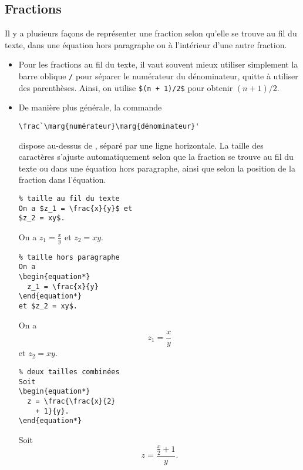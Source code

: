 \subsection{Fractions}
\label{sec:math:bases:fractions}

Il y a plusieurs façons de représenter une fraction selon qu'elle se
trouve au fil du texte, dans une équation hors paragraphe ou à
l'intérieur d'une autre fraction.
\begin{itemize}
\item Pour les fractions au fil du texte, il vaut souvent mieux
  utiliser simplement la barre oblique \verb=/= pour séparer le
  numérateur du dénominateur, quitte à utiliser des parenthèses.
  Ainsi, on utilise \verb=$(n + 1)/2$= pour obtenir $(n + 1)/2$.
\item De manière plus générale, la commande
\begin{lstlisting}
\frac`\marg{numérateur}\marg{dénominateur}'
\end{lstlisting}
  dispose  au-dessus de , séparé
  par une ligne horizontale. La taille des caractères s'ajuste
  automatiquement selon que la fraction se trouve au fil
  du texte ou dans une équation hors paragraphe, ainsi que selon la
  position de la fraction dans l'équation.
  \begin{demo}
    \begin{texample}
\begin{lstlisting}
% taille au fil du texte
On a $z_1 = \frac{x}{y}$ et
$z_2 = xy$.
\end{lstlisting}
      \producing
      On a $z_1 = \frac{x}{y}$ et $z_2 = xy$.
    \end{texample}

    \begin{texample}
\begin{lstlisting}
% taille hors paragraphe
On a
\begin{equation*}
  z_1 = \frac{x}{y}
\end{equation*}
et $z_2 = xy$.
\end{lstlisting}
      \producing
      On a
      \begin{equation*}
        z_1 = \frac{x}{y}
      \end{equation*}
      et $z_2 = xy$.
    \end{texample}

    \begin{texample}
\begin{lstlisting}
% deux tailles combinées
Soit
\begin{equation*}
  z = \frac{\frac{x}{2}
    + 1}{y}.
\end{equation*}
\end{lstlisting}
      \producing
      Soit
      \begin{equation*}
        z = \frac{\frac{x}{2} + 1}{y}.
      \end{equation*}
    \end{texample}
  \end{demo}


\end{itemize}
